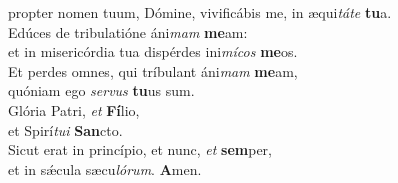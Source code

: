 \evenverse propter nomen tuum, Dómine, vivificábis me, in æqui\textit{tá}\textit{te} \textbf{tu}a.\\
\oddverse Edúces de tribulatióne áni\textit{mam} \textbf{me}am:~\*\\
\oddverse et in misericórdia tua dispérdes ini\textit{mí}\textit{cos} \textbf{me}os.\\
\evenverse Et perdes omnes, qui tríbulant áni\textit{mam} \textbf{me}am,~\*\\
\evenverse quóniam ego \textit{ser}\textit{vus} \textbf{tu}us sum.\\
\oddverse Glória Patri, \textit{et} \textbf{Fí}lio,~\*\\
\oddverse et Spirí\textit{tu}\textit{i} \textbf{San}cto.\\
\evenverse Sicut erat in princípio, et nunc, \textit{et} \textbf{sem}per,~\*\\
\evenverse et in sǽcula sæcu\textit{ló}\textit{rum}. \textbf{A}men.\\
